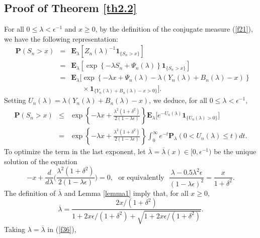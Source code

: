 \documentclass{gSTA2e}
\theoremstyle{plain}
\theoremstyle{definition}
\theoremstyle{remark}
\begin{document}
\subsection{Proof of Theorem \ref{th2.2}}
For all $ 0\leq \lambda <\epsilon^{-1}$ and $ x \geq0$,  by the definition of the conjugate measure (\ref{f21}), we have the following representation:
\begin{eqnarray*}
\ \ \ \mathbf{P}(S_n>x ) &= & \mathbf{E}_\lambda \left[ Z_n (\lambda)^{-1}\mathbf{1}_{\{S_n>x\}} \right]\\
&= & \mathbf{E}_\lambda \left[ \exp \left\{
-\lambda S_n+\Psi _n(\lambda )\right\}  \mathbf{1}_{\{S_n>x\}}\right] \nonumber\\
&= & \mathbf{E}_\lambda \Big[  \exp \left\{-\lambda x +\Psi _n(\lambda )
 -\lambda ( Y_n(\lambda) + B_{n}(\lambda) - x ) \right\}  \nonumber \\
 && \ \ \ \  \ \ \  \times \mathbf{1}_{\{Y_{n}(\lambda)+B_n(\lambda)-x>0\}}  \Big].\nonumber
\end{eqnarray*}
Setting $ U_n(\lambda)= \lambda (Y_{n}(\lambda)+B_n(\lambda)-x)$, we deduce,  for all $0\leq \lambda < \epsilon^{-1} ,$
\begin{eqnarray}
 \mathbf{P}(S_n>x ) &\leq & \exp \left\{
- \lambda x +\frac{\lambda^2(1+\delta^2)}{2 (1-\lambda\epsilon)} \right\} \mathbf{E}_\lambda \Big[ e^{ - U_n(\lambda)  }   \mathbf{1}_{\{U_n(\lambda)>0\}} \Big] \nonumber\\
&=&  \exp \left\{
- \lambda x +\frac{\lambda^2(1+\delta^2)}{2 (1-\lambda\epsilon)} \right\} \int_0^{\infty}  e^{ -  t  } \mathbf{P}_\lambda(0 < U_n(\lambda) \leq t) dt.\label{f36}
\end{eqnarray}
To optimize the term in the last exponent, let
$\overline{\lambda }=\overline{\lambda }(x) \in [0, \epsilon^{-1})$ be the
unique solution of the equation
\begin{equation}\label{defranda}
-  x + \frac{d}{d \lambda} \Big(\frac{\lambda^2(1+\delta^2)}{2 (1-\lambda\epsilon)} \Big)=0, \ \  \ \mbox{or equivalently} \ \ \  \frac{\lambda-0.5\lambda^2\epsilon}{ (1-\lambda\epsilon)^2} =\frac{x}{1+\delta^2}.
\end{equation}
The definition of $\overline{\lambda }$ and Lemma \ref{lemma1} imply that, for all $  x \geq 0,$
\begin{equation}
  \overline{\lambda }= \frac{2x/(1+ \delta^2)}{ 1+2x\epsilon/(1+ \delta^2)+\sqrt{1+2x\epsilon/(1+ \delta^2)} }. \label{fsf2}
\end{equation}
Taking $\lambda =\overline{\lambda }$  in (\ref{f36}),
\end{document}
